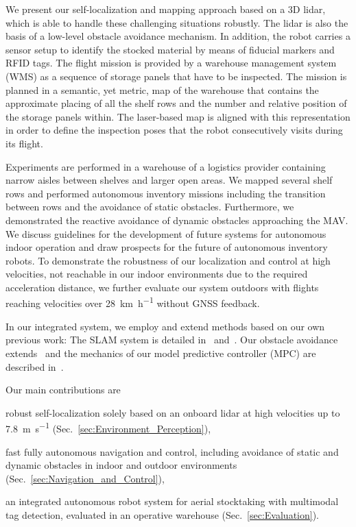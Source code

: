 We present our self-localization and mapping approach based on a 3D lidar, which is able to handle these challenging situations robustly. The lidar is also the basis of a low-level obstacle avoidance mechanism. In addition, the robot carries a sensor setup to identify the stocked material by means of fiducial markers and RFID tags. The flight mission is provided by a warehouse management system (WMS) as a sequence of storage panels that have to be inspected. The mission is planned in a semantic, yet metric, map of the warehouse that contains the approximate placing of all the shelf rows and the number and relative position of the storage panels within. The laser-based map is aligned with this representation in order to define the inspection poses that the robot consecutively visits during its flight.

Experiments are performed in a warehouse of a logistics provider containing narrow aisles between shelves and larger open areas.
We mapped several shelf rows and performed autonomous inventory missions including the transition between rows and the avoidance of static obstacles.
Furthermore, we demonstrated the reactive avoidance of dynamic obstacles approaching the MAV.
We discuss guidelines for the development of future systems for autonomous indoor operation and draw prospects for the future of autonomous inventory robots.
To demonstrate the robustness of our localization and control at high velocities, not reachable in our indoor environments due to the required acceleration distance, we further evaluate our system outdoors with flights reaching velocities over \SI{28}{\kilo\meter\per\hour} without GNSS feedback.

In our integrated system, we employ and extend methods based on our own previous work: The SLAM system is detailed in~\cite{Droeschel2017104} and~\cite{Droeschel:ICRA2014}. Our obstacle avoidance extends~\cite{nieuwenhuisen2013isprs} and the mechanics of our model predictive controller (MPC) are described in~\cite{beul2017icuas}.

\noindent Our main contributions are
\begin{compactitem}
    \item robust self-localization solely based on an onboard lidar at high velocities up to \SI{7.8}{\meter\per\second} (Sec.~\ref{sec:Environment_Perception}),
    \item fast fully autonomous navigation and control, including avoidance of static and dynamic obstacles in indoor and outdoor environments (Sec.~\ref{sec:Navigation_and_Control}),
    \item an integrated autonomous robot system for aerial stocktaking with multimodal tag detection, evaluated in an operative warehouse (Sec.~\ref{sec:Evaluation}).
\end{compactitem}
